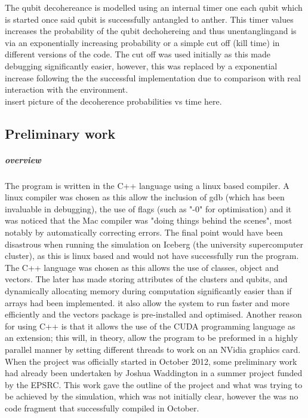 \documentclass{article}
\numberwithin{equation}{section} %
\begin{document}
 The qubit decohereance is modelled using an internal timer one each qubit which is started once said qubit is successfully antangled to anther. This timer values increases the probability of the qubit dechohereing and thus unentanglingand is via an exponentially increasing probability or a simple cut off (kill time) in different versions of the code. The cut off was used initially as this made debugging significantly easier, however, this was replaced by a exponential increase following the the successful implementation due to comparison with real interaction with the environment. \\

insert picture of the decoherence probabilities vs time here. \\

\subsection{Preliminary work}

\subparagraph{overview}
The program is written in the C++ language using a linux based compiler. A linux compiler was chosen as this allow the inclusion of gdb (which has been invaluable in debugging), the use of flags (such as "-0" for optimisation) and it was noticed that the Mac compiler was "doing things behind the scenes", most notably by automatically correcting errors. The final point would have been disastrous when running the simulation on Iceberg (the university supercomputer cluster), as this is linux based and would not have successfully run the program. \\

 The C++ language was chosen as this allows the use of classes, object and vectors. The later has made storing attributes of the clusters and qubits, and dynamically allocating memory during computation significantly easier than if arrays had been implemented. it also allow the system to run faster and more efficiently and the vectors package is pre-installed and optimised. Another reason for using C++ is that it allows the use of the CUDA programming language as an extension; this will, in theory, allow the program to be preformed in a highly parallel manner by setting different threads to work on an NVidia graphics card. \\
 
 When the project was officially started in October 2012, some preliminary work had already been undertaken by Joshua Waddington in a summer project funded by the EPSRC. This work gave the outline of the project and what was trying to be achieved  by the simulation, which was not initially clear, however the was no code fragment that successfully compiled in October. \\
 
\end{document}
